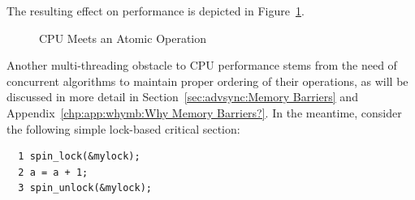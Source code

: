 The resulting effect on performance is depicted in
Figure~\ref{fig:intro:CPU Meets an Atomic Operation}.

\begin{figure}[htb]
\begin{center}
\end{center}
\caption{CPU Meets an Atomic Operation}
\label{fig:intro:CPU Meets an Atomic Operation}
\end{figure}

Another multi-threading obstacle to CPU performance stems from the
need of concurrent algorithms to maintain proper ordering of their
operations, as will be discussed in more detail in
Section~\ref{sec:advsync:Memory Barriers} and
Appendix~\ref{chp:app:whymb:Why Memory Barriers?}.
In the meantime, consider the following simple lock-based critical
section:

\vspace{5pt}
\begin{minipage}[t]{\columnwidth}
\small
\begin{verbatim}
  1 spin_lock(&mylock);
  2 a = a + 1;
  3 spin_unlock(&mylock);
\end{verbatim}
\end{minipage}
\vspace{5pt}

